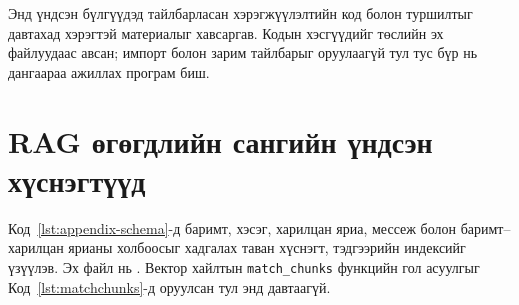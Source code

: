 \documentclass[../main.tex]{subfiles}
\begin{document}
Энд үндсэн бүлгүүдэд тайлбарласан хэрэгжүүлэлтийн код болон туршилтыг
давтахад хэрэгтэй материалыг хавсаргав. Кодын хэсгүүдийг төслийн эх
файлуудаас авсан; импорт болон зарим тайлбарыг оруулаагүй тул тус бүр нь
дангаараа ажиллах програм биш.

\begingroup
{}

\section{RAG өгөгдлийн сангийн үндсэн хүснэгтүүд}
\label{sec:appendix-schema}

Код~\ref{lst:appendix-schema}-д баримт, хэсэг, харилцан яриа, мессеж болон
баримт--харилцан ярианы холбоосыг хадгалах таван хүснэгт, тэдгээрийн
индексийг үзүүлэв. Эх файл нь .
Вектор хайлтын \texttt{match\_chunks} функцийн гол асуулгыг
Код~\ref{lst:matchchunks}-д оруулсан тул энд давтаагүй.
\end{document}
